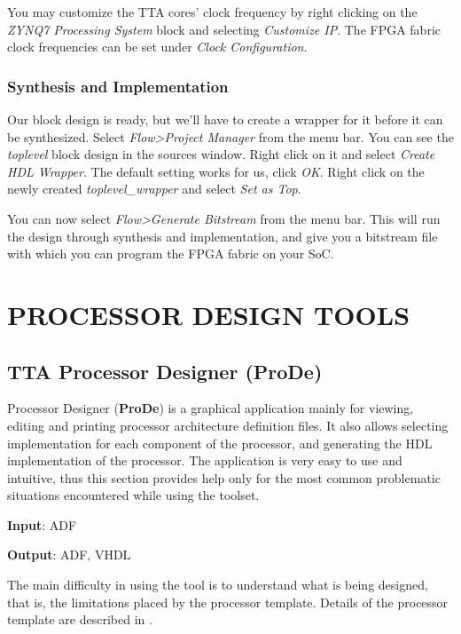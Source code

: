 \documentclass[twoside]{tceusermanual}
\begin{document}
You may customize the TTA cores' clock frequency by right clicking on the
\textit{ZYNQ7 Processing System} block and selecting \textit{Customize IP}.
The FPGA fabric clock frequencies can be set under \textit{Clock Configuration}.

\subsection{Synthesis and Implementation}

Our block design is ready, but we'll have to create a wrapper for it before
it can be synthesized. Select \textit{Flow>Project Manager} from the menu bar.
You can see the \textit{toplevel} block design in the sources window. Right
click on it and select \textit{Create HDL Wrapper}. The default setting works
for us, click \textit{OK}. Right click on the newly created
\textit{toplevel\_wrapper} and select \textit{Set as Top}.

You can now select \textit{Flow>Generate Bitstream} from the menu bar. This will
run the design through synthesis and implementation, and give you a bitstream
file with which you can program the FPGA fabric on your SoC.

\chapter{PROCESSOR DESIGN TOOLS}
\label{chapter:procgen}

\section{TTA Processor Designer (ProDe)}
\label{sec:prode}

Processor Designer (\textbf{ProDe}) is a graphical application mainly for
viewing, editing and printing processor architecture definition files. 
It also allows selecting implementation for each component of the processor,
and generating the HDL implementation of the processor. The application is
very easy to use and intuitive, thus this section provides help only for the
most common problematic situations encountered while using the toolset.

\textbf{Input}: ADF

\textbf{Output}: ADF, VHDL

The main difficulty in using the tool is to understand what is being
designed, that is, the limitations placed by the processor template. 
Details of the processor template are described in \cite{ADF-specs}.
\end{document}
